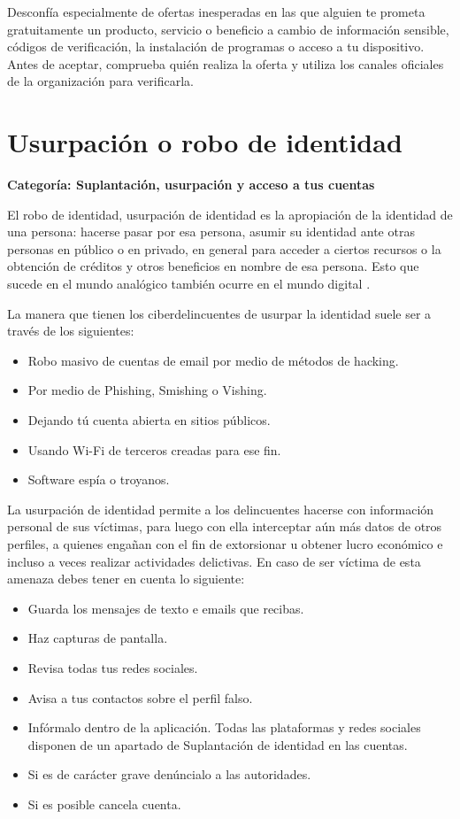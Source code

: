 \documentclass[
  spanish,
  a4paper,
  openany]{book}
\begin{document}
Desconfía especialmente de ofertas inesperadas en las que alguien te prometa gratuitamente un producto, servicio o beneficio a cambio de información sensible, códigos de verificación, la instalación de programas o acceso a tu dispositivo. Antes de aceptar, comprueba quién realiza la oferta y utiliza los canales oficiales de la organización para verificarla.

\section{Usurpación o robo de identidad}\label{usurpaciuxf3n-o-robo-de-identidad}

\textbf{Categoría: Suplantación, usurpación y acceso a tus cuentas}

El robo de identidad, usurpación de identidad es la apropiación de la identidad de una persona: hacerse pasar por esa persona, asumir su identidad ante otras personas en público o en privado, en general para acceder a ciertos recursos o la obtención de créditos y otros beneficios en nombre de esa persona. Esto que sucede en el mundo analógico también ocurre en el mundo digital \citep{WIKI-usurpacion}.

La manera que tienen los ciberdelincuentes de usurpar la identidad suele ser a través de los siguientes:

\begin{itemize}
\item
  Robo masivo de cuentas de email por medio de métodos de hacking.
\item
  Por medio de Phishing, Smishing o Vishing.
\item
  Dejando tú cuenta abierta en sitios públicos.
\item
  Usando Wi-Fi de terceros creadas para ese fin.
\item
  Software espía o troyanos.
\end{itemize}

La usurpación de identidad permite a los delincuentes hacerse con información personal de sus víctimas, para luego con ella interceptar aún más datos de otros perfiles, a quienes engañan con el fin de extorsionar u obtener lucro económico e incluso a veces realizar actividades delictivas.
En caso de ser víctima de esta amenaza debes tener en cuenta lo siguiente:

\begin{itemize}
\item
  Guarda los mensajes de texto e emails que recibas.
\item
  Haz capturas de pantalla.
\item
  Revisa todas tus redes sociales.
\item
  Avisa a tus contactos sobre el perfil falso.
\item
  Infórmalo dentro de la aplicación. Todas las plataformas y redes sociales disponen de un apartado de Suplantación de identidad en las cuentas.
\item
  Si es de carácter grave denúncialo a las autoridades.
\item
  Si es posible cancela cuenta.
\end{itemize}
\end{document}
